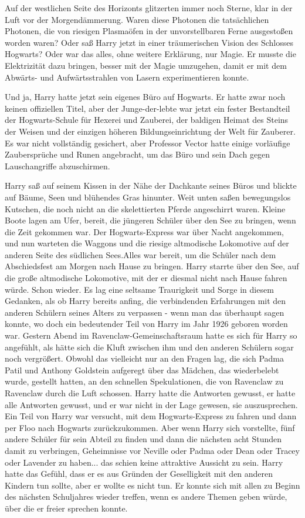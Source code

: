 Auf der westlichen Seite des Horizonts glitzerten immer noch Sterne, klar in der
Luft vor der Morgendämmerung. Waren diese Photonen die tatsächlichen Photonen,
die von riesigen Plasmaöfen in der unvorstellbaren Ferne ausgestoßen worden
waren? Oder saß Harry jetzt in einer träumerischen Vision des Schlosses
Hogwarts? Oder war das alles, ohne weitere Erklärung, \glqq nur Magie\grqq{}. Er
musste die Elektrizität dazu bringen, besser mit der Magie umzugehen, damit er
mit dem Abwärts- und Aufwärtsstrahlen von Lasern experimentieren konnte.

Und ja, Harry hatte jetzt sein eigenes Büro auf Hogwarts. Er hatte zwar noch
keinen offiziellen Titel, aber der Junge-der-lebte war jetzt ein fester
Bestandteil der Hogwarts-Schule für Hexerei und Zauberei, der baldigen Heimat
des Steins der Weisen und der einzigen höheren Bildungseinrichtung der Welt für
Zauberer. Es war nicht vollständig gesichert, aber Professor Vector hatte einige
vorläufige Zaubersprüche und Runen angebracht, um das Büro und sein Dach gegen
Lauschangriffe abzuschirmen.

Harry saß auf seinem Kissen in der Nähe der Dachkante seines Büros und blickte
auf Bäume, Seen und blühendes Gras hinunter. Weit unten saßen bewegungslos
Kutschen, die noch nicht an die skelettierten Pferde angeschirrt waren. Kleine
Boote lagen am Ufer, bereit, die jüngeren Schüler über den See zu bringen, wenn
die Zeit gekommen war. Der Hogwarts-Express war über Nacht angekommen, und nun
warteten die Waggons und die riesige altmodische Lokomotive auf der anderen
Seite des südlichen Sees.Alles war bereit, um die Schüler nach dem Abschiedsfest
am Morgen nach Hause zu bringen. Harry starrte über den See, auf die große
altmodische Lokomotive, mit der er diesmal nicht nach Hause fahren würde. Schon
wieder. Es lag eine seltsame Traurigkeit und Sorge in diesem Gedanken, als ob
Harry bereits anfing, die verbindenden Erfahrungen mit den anderen Schülern
seines Alters zu verpassen - wenn man das überhaupt sagen konnte, wo doch ein
bedeutender Teil von Harry im Jahr 1926 geboren worden war. Gestern Abend im
Ravenclaw-Gemeinschaftsraum hatte es sich für Harry so angefühlt, als hätte sich
die Kluft zwischen ihm und den anderen Schülern sogar noch vergrößert. Obwohl
das vielleicht nur an den Fragen lag, die sich Padma Patil und Anthony Goldstein
aufgeregt über das Mädchen, das wiederbelebt wurde, gestellt hatten, an den
schnellen Spekulationen, die von Ravenclaw zu Ravenclaw durch die Luft schossen.
Harry hatte die Antworten gewusst, er hatte alle Antworten gewusst, und er war
nicht in der Lage gewesen, sie auszusprechen. Ein Teil von Harry war versucht,
mit dem Hogwarts-Express zu fahren und dann per Floo nach Hogwarts
zurückzukommen. Aber wenn Harry sich vorstellte, fünf andere Schüler für sein
Abteil zu finden und dann die nächsten acht Stunden damit zu verbringen,
Geheimnisse vor Neville oder Padma oder Dean oder Tracey oder Lavender zu
haben... das schien keine attraktive Aussicht zu sein. Harry hatte das Gefühl,
dass er es aus Gründen der Geselligkeit mit den anderen Kindern tun sollte, aber
er wollte es nicht tun. Er konnte sich mit allen zu Beginn des nächsten
Schuljahres wieder treffen, wenn es andere Themen geben würde, über die er
freier sprechen konnte.

